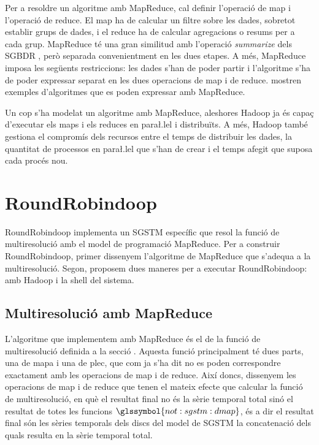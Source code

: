 Per a resoldre un algoritme amb MapReduce, cal definir l'operació de
map i l'operació de reduce. El map ha de calcular un filtre sobre les
dades, sobretot establir grups de dades, i el reduce ha de calcular
agregacions o resums per a cada grup. MapReduce té una gran similitud
amb l'operació \emph{summarize} dels
\gls{SGBDR} \parencite[cap.~7]{date04:introduction8}, però separada
convenientment en les dues etapes.  A més, MapReduce imposa les
següents restriccions: les dades s'han de poder partir i l'algoritme
s'ha de poder expressar separat en les dues operacions de map i de
reduce.  \textcite{deanghemawat04:mapreduce} mostren exemples
d'algoritmes que es poden expressar amb MapReduce.



Un cop s'ha modelat un algoritme amb MapReduce, aleshores Hadoop ja és
capaç d'executar els maps i els reduces en para\l.lel i distribuïts. A
més, Hadoop també gestiona el compromís dels recursos entre el temps
de distribuir les dades, la quantitat de processos en para\l.lel que
s'han de crear i el temps afegit que suposa cada procés nou.








\section{RoundRobindoop}


RoundRobindoop implementa un \gls{SGSTM} específic que resol la funció
de multiresolució amb el model de programació MapReduce.  Per a
construir RoundRobindoop, primer dissenyem l'algoritme de MapReduce
que s'adequa a la multiresolució. Segon, proposem dues maneres per a
executar RoundRobindoop: amb Hadoop i la shell del sistema.



\subsection{Multiresolució amb MapReduce}

L'algoritme que implementem amb MapReduce és el de la funció de
multiresolució definida a la secció . Aquesta funció principalment té dues
parts, una de mapa i una de plec, que com ja s'ha dit no es poden
correspondre exactament amb les operacions de map i de reduce. 
 Així
doncs, dissenyem les operacions de map i de reduce que tenen el mateix
efecte que calcular la funció de multiresolució, en què el resultat
final no és la sèrie temporal total sinó el resultat de totes les
funcions $\glssymbol{not:sgstm:dmap}$, és a dir el resultat final són
les sèries temporals dels discs del model de \gls{SGSTM} la
concatenació dels quals resulta en la sèrie temporal total.



